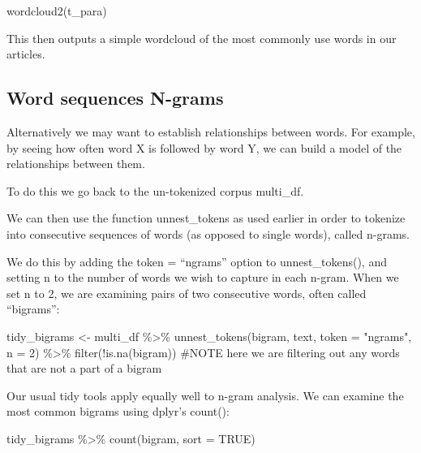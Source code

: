 \documentclass[
  letterpaper,
  DIV=11,
  numbers=noendperiod]{scrartcl}
\newenvironment{Shaded}{\begin{snugshade}}{\end{snugshade}}
\newcommand{\AttributeTok}[1]{\textcolor[rgb]{0.40,0.45,0.13}{#1}}
\newcommand{\CommentTok}[1]{\textcolor[rgb]{0.37,0.37,0.37}{#1}}
\newcommand{\ConstantTok}[1]{\textcolor[rgb]{0.56,0.35,0.01}{#1}}
\newcommand{\DecValTok}[1]{\textcolor[rgb]{0.68,0.00,0.00}{#1}}
\newcommand{\FunctionTok}[1]{\textcolor[rgb]{0.28,0.35,0.67}{#1}}
\newcommand{\NormalTok}[1]{\textcolor[rgb]{0.00,0.23,0.31}{#1}}
\newcommand{\OtherTok}[1]{\textcolor[rgb]{0.00,0.23,0.31}{#1}}
\newcommand{\SpecialCharTok}[1]{\textcolor[rgb]{0.37,0.37,0.37}{#1}}
\newcommand{\StringTok}[1]{\textcolor[rgb]{0.13,0.47,0.30}{#1}}
\begin{document}
\begin{Shaded}
\begin{Highlighting}[]
\FunctionTok{wordcloud2}\NormalTok{(t\_para)}
\end{Highlighting}
\end{Shaded}

This then outputs a simple wordcloud of the most commonly use words in
our articles.

\hypertarget{word-sequences-n-grams}{%
\subsection{Word sequences N-grams}\label{word-sequences-n-grams}}

Alternatively we may want to establish relationships between words. For
example, by seeing how often word X is followed by word Y, we can build
a model of the relationships between them.

To do this we go back to the un-tokenized corpus multi\_df.

We can then use the function unnest\_tokens as used earlier in order to
tokenize into consecutive sequences of words (as opposed to single
words), called n-grams.

We do this by adding the token = ``ngrams'' option to unnest\_tokens(),
and setting n to the number of words we wish to capture in each n-gram.
When we set n to 2, we are examining pairs of two consecutive words,
often called ``bigrams'':

\begin{Shaded}
\begin{Highlighting}[]
\NormalTok{tidy\_bigrams }\OtherTok{\textless{}{-}}\NormalTok{ multi\_df }\SpecialCharTok{\%\textgreater{}\%}
  \FunctionTok{unnest\_tokens}\NormalTok{(bigram, text, }\AttributeTok{token =} \StringTok{"ngrams"}\NormalTok{, }\AttributeTok{n =} \DecValTok{2}\NormalTok{) }\SpecialCharTok{\%\textgreater{}\%}
  \FunctionTok{filter}\NormalTok{(}\SpecialCharTok{!}\FunctionTok{is.na}\NormalTok{(bigram)) }\CommentTok{\#NOTE here we are filtering out any words that are not a part of a bigram}
\end{Highlighting}
\end{Shaded}

Our usual tidy tools apply equally well to n-gram analysis. We can
examine the most common bigrams using dplyr's count():

\begin{Shaded}
\begin{Highlighting}[]
\NormalTok{tidy\_bigrams }\SpecialCharTok{\%\textgreater{}\%}
  \FunctionTok{count}\NormalTok{(bigram, }\AttributeTok{sort =} \ConstantTok{TRUE}\NormalTok{)}
\end{Highlighting}
\end{Shaded}
\end{document}
